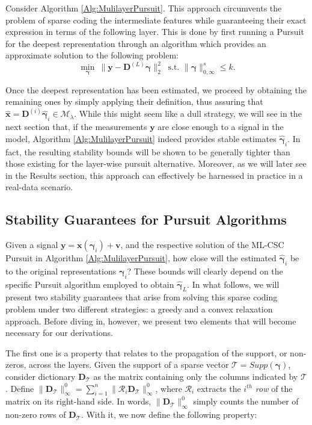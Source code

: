 \documentclass[10pt,journal]{IEEEtran}
\def\x{{\mathbf x}}
\def\v{{\mathbf v}}
\def\y{{\mathbf y}}
\def\D{{\mathbf D}}
\def\M{{\mathcal{M}}}
\def\gama{{\boldsymbol \gamma}}
\theoremstyle{plain}
\theoremstyle{definition}
\begin{document}
Consider Algorithm \ref{Alg:MulilayerPursuit}. This approach circumvents the problem of sparse coding the intermediate features while guaranteeing their exact expression in terms of the following layer. This is done by first running a Pursuit for the deepest representation through an algorithm which provides an approximate solution to the following problem:
\begin{equation}\label{eq:PursuitDeepest}
	\underset{\gama}{\min}\ \|\y - \D^{(L)} \gama \|_2^2\ \text{ s.t. } \|\gama\|^s_{0,\infty} \leq k.
\end{equation}

Once the deepest representation has been estimated, we proceed by obtaining the remaining ones by simply applying their definition, thus assuring that $\hat{\x} = \D^{(i)}\hat{\gama}_i \in \M_\lambda$. While this might seem like a dull strategy, we will see in the next section that, if the measurements $\y$ are close enough to a signal in the model, Algorithm \ref{Alg:MulilayerPursuit} indeed provides stable estimates $\hat{\gama}_i$. In fact, the resulting stability bounds will be shown to be generally tighter than those existing for the layer-wise pursuit alternative. Moreover, as we will later see in the Results section, this approach can effectively be harnessed in practice in a real-data scenario. 


\subsection{Stability Guarantees for Pursuit Algorithms}
\label{sec:StabilityPursuits}
Given a signal $\y = \x(\gama_i) + \v$, and the respective solution of the ML-CSC Pursuit in Algorithm \ref{Alg:MulilayerPursuit}, how close will the estimated $\hat{\gama}_i$ be to the original representations $\gama_i$? These bounds will clearly depend on the specific Pursuit algorithm employed to obtain $\hat{\gama}_L$. In what follows, we will present two stability guarantees that arise from solving this sparse coding problem under two different strategies: a greedy and a convex relaxation approach. Before diving in, however, we present two elements that will become necessary for our derivations. 

The first one is a property that relates to the propagation of the support, or non-zeros, across the layers. Given the support of a sparse vector $\mathcal{T} = Supp(\gama)$, consider dictionary $\D_\mathcal{T}$ as the matrix containing only the columns indicated by $\mathcal{T}$. Define $\|\D_\mathcal{T}\|^0_{\infty} = \sum_{i=1}^{n} \|\mathcal{R}_i \D_\mathcal{T}\|^0_{\infty}$, where $\mathcal{R}_i$ extracts the $i^{th}$ \emph{row} of the matrix on its right-hand side. In words, $\|\D_\mathcal{T}\|^0_{\infty}$ simply counts the number of non-zero rows of $\D_\mathcal{T}$. With it, we now define the following property:
\end{document}
